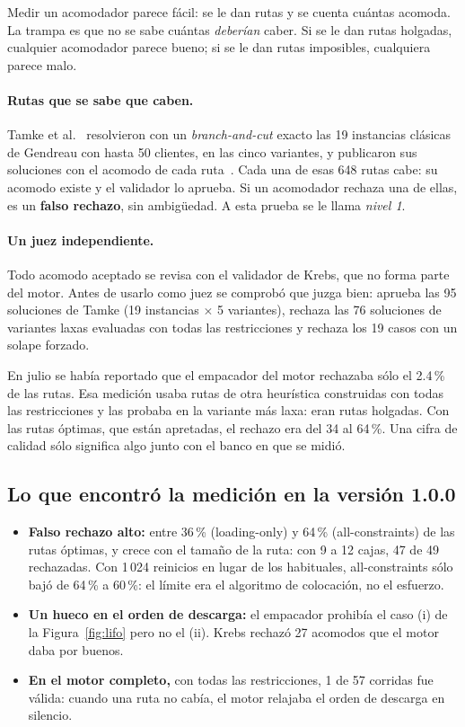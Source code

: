 \documentclass[11pt,a4paper]{article}
\begin{document}
Medir un acomodador parece fácil: se le dan rutas y se cuenta cuántas acomoda. La trampa es que no se
sabe cuántas \emph{deberían} caber. Si se le dan rutas holgadas, cualquier acomodador parece bueno; si
se le dan rutas imposibles, cualquiera parece malo.

\paragraph{Rutas que se sabe que caben.} Tamke et al.~\cite{tamke2025} resolvieron con un
\emph{branch-and-cut} exacto las 19 instancias clásicas de Gendreau con hasta 50 clientes, en las
cinco variantes, y publicaron sus soluciones con el acomodo de cada ruta~\cite{tamkerepo}. Cada una de
esas 648 rutas cabe: su acomodo existe y el validador lo aprueba. Si un acomodador rechaza una de ellas,
es un \textbf{falso rechazo}, sin ambigüedad. A esta prueba se le llama \emph{nivel 1}.

\paragraph{Un juez independiente.} Todo acomodo aceptado se revisa con el validador de Krebs, que no
forma parte del motor. Antes de usarlo como juez se comprobó que juzga bien: aprueba las 95
soluciones de Tamke (19 instancias $\times$ 5 variantes), rechaza las 76 soluciones de variantes laxas
evaluadas con todas las restricciones y rechaza los 19 casos con un solape forzado.

\begin{leccion}
En julio se había reportado que el empacador del motor rechazaba sólo el 2.4\,\% de las rutas. Esa
medición usaba rutas de otra heurística construidas con todas las restricciones y las probaba en la
variante más laxa: eran rutas holgadas. Con las rutas óptimas, que están apretadas, el rechazo era del
34 al 64\,\%. Una cifra de calidad sólo significa algo junto con el banco en que se midió.
\end{leccion}

\subsection{Lo que encontró la medición en la versión 1.0.0}

\begin{itemize}[leftmargin=1.5em]
\item \textbf{Falso rechazo alto:} entre 36\,\% (loading-only) y 64\,\% (all-constraints) de las rutas
óptimas, y crece con el tamaño de la ruta: con 9 a 12 cajas, 47 de 49 rechazadas. Con 1\,024
reinicios en lugar de los habituales, all-constraints sólo bajó de 64\,\% a 60\,\%: el límite era el
algoritmo de colocación, no el esfuerzo.
\item \textbf{Un hueco en el orden de descarga:} el empacador prohibía el caso (i) de la
Figura~\ref{fig:lifo} pero no el (ii). Krebs rechazó 27 acomodos que el motor daba por buenos.
\item \textbf{En el motor completo,} con todas las restricciones, 1 de 57 corridas fue válida: cuando
una ruta no cabía, el motor relajaba el orden de descarga en silencio.
\end{itemize}
\end{document}
